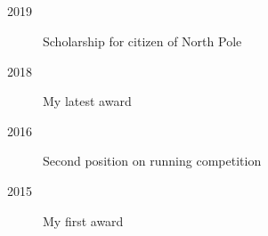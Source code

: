 \documentclass[margin,line,a4paper]{resume}
\begin{document}
\begin{resume}
\section{}\vspace{1mm}

\begin{description}
    \item[2019] Scholarship for citizen of North Pole
    \item[2018] My latest award
    \item[2016] Second position on running competition
    \item[2015] My first award
\end{description}



\end{resume}
\end{document}
